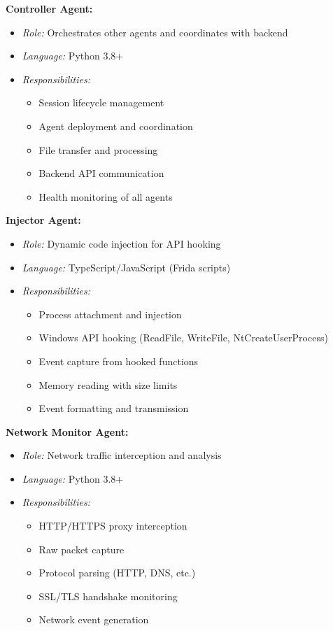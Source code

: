 \textbf{Controller Agent:}
\begin{itemize}
    \item \textit{Role:} Orchestrates other agents and coordinates with backend
    \item \textit{Language:} Python 3.8+
    \item \textit{Responsibilities:}
    \begin{itemize}
        \item Session lifecycle management
        \item Agent deployment and coordination
        \item File transfer and processing
        \item Backend API communication
        \item Health monitoring of all agents
    \end{itemize}
\end{itemize}

\textbf{Injector Agent:}
\begin{itemize}
    \item \textit{Role:} Dynamic code injection for API hooking
    \item \textit{Language:} TypeScript/JavaScript (Frida scripts)
    \item \textit{Responsibilities:}
    \begin{itemize}
        \item Process attachment and injection
        \item Windows API hooking (ReadFile, WriteFile, NtCreateUserProcess)
        \item Event capture from hooked functions
        \item Memory reading with size limits
        \item Event formatting and transmission
    \end{itemize}
\end{itemize}

\textbf{Network Monitor Agent:}
\begin{itemize}
    \item \textit{Role:} Network traffic interception and analysis
    \item \textit{Language:} Python 3.8+
    \item \textit{Responsibilities:}
    \begin{itemize}
        \item HTTP/HTTPS proxy interception
        \item Raw packet capture
        \item Protocol parsing (HTTP, DNS, etc.)
        \item SSL/TLS handshake monitoring
        \item Network event generation
    \end{itemize}
\end{itemize}

